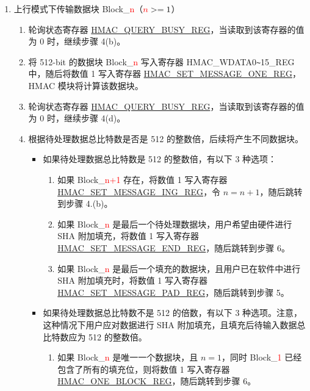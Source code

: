 \documentclass[main\_\_CN.tex]{subfiles}
\begin{document}
\begin{enumerate}
    \item 上行模式下传输数据块 Block\_\textcolor{red}{n}（$\textcolor{red}{n}>=1$）
        \begin{enumerate}
            \item 轮询状态寄存器 \hyperref[regdesc:HMACQUERYBUSYREG]{HMAC\_QUERY\_BUSY\_REG}，当读取到该寄存器的值为 0 时，继续步骤 4(b)。
            \item 将 512-bit 的数据块 Block\_\textcolor{red}{n} 写入寄存器 HMAC\_WDATA0\verb+~+15\_REG 中，随后将数值 1 写入寄存器 \hyperref[regdesc:HMACSETMESSAGEONEREG]{HMAC\_SET\_MESSAGE\_ONE\_REG}，HMAC 模块将计算该数据块。
            \item 轮询状态寄存器 \hyperref[regdesc:HMACQUERYBUSYREG]{HMAC\_QUERY\_BUSY\_REG}，当读取到该寄存器的值为 0 时，继续步骤 4(d)。
            \item 根据待处理数据总比特数是否是 512 的整数倍，后续将产生不同数据块。
            \begin{itemize}
                \item 如果待处理数据总比特数是 512 的整数倍，有以下 3 种选项：
                \begin{enumerate}
                    \item 如果 Block\_\textcolor{red}{n+1} 存在，将数值 1 写入寄存器 \hyperref[regdesc:HMACSETMESSAGEINGREG]{HMAC\_SET\_MESSAGE\_ING\_REG}，令 $n=n+1$，随后跳转到步骤 4.(b)。
                    \item 如果 Block\_\textcolor{red}{n} 是最后一个待处理数据块，用户希望由硬件进行 SHA 附加填充，将数值 1 写入寄存器 \hyperref[regdesc:HMACSETMESSAGEENDREG]{HMAC\_SET\_MESSAGE\_END\_REG}，随后跳转到步骤 6。
                    \item 如果 Block\_\textcolor{red}{n} 是最后一个填充的数据块，且用户已在软件中进行 SHA 附加填充时，将数值 1 写入寄存器 \hyperref[regdesc:HMACSETMESSAGEPADREG]{HMAC\_SET\_MESSAGE\_PAD\_REG}，随后跳转到步骤 5。
                \end{enumerate}
                \item 如果待处理数据总比特数不是 512 的倍数，有以下 3 种选项。注意，这种情况下用户应对数据进行 SHA 附加填充，且填充后待输入数据总比特数应为 512 的整数倍。
                \begin{enumerate}
                    \item 如果 Block\_\textcolor{red}{n} 是唯一一个数据块，且 $n=1$，同时 Block\_\textcolor{red}{1} 已经包含了所有的填充位，则将数值 1 写入寄存器 \hyperref[regdesc:HMACONEBLOCKREG]{HMAC\_ONE\_BLOCK\_REG}，随后跳转到步骤 6。

\end{enumerate}
\end{itemize}
\end{enumerate}
\end{enumerate}
\end{document}
